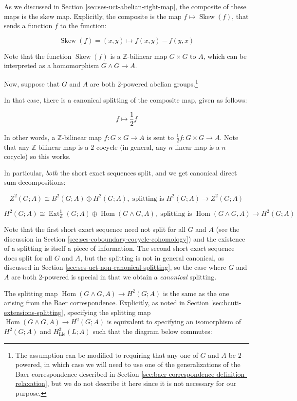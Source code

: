 \documentclass{ucetd}
\begin{document}
As we discussed in Section \ref{sec:ses-uct-abelian-right-map}, the
composite of these maps is the skew map. Explicitly, the composite is
the map $f \mapsto \operatorname{Skew}(f)$, that sends a function $f$
to the function:

$$\operatorname{Skew}(f) = (x,y) \mapsto f(x,y) - f(y,x)$$

Note that the function $\operatorname{Skew}(f)$ is a
$\mathbb{Z}$-bilinear map $G \times G$ to $A$, which can be
interpreted as a homomorphism $G \wedge G \to A$.

Now, suppose that $G$ and $A$ are both $2$-powered abelian
groups.\footnote{The assumption can be modified to requiring that any
  one of $G$ and $A$ be $2$-powered, in which case we will need to use
  one of the generalizations of the Baer correspondence described in
  Section \ref{sec:baer-correspondence-definition-relaxation}, but we
  do not describe it here since it is not necessary for our purpose.}

In that case, there is a canonical splitting of the composite map,
given as follows:

$$f \mapsto \frac{1}{2}f$$

In other words, a $\mathbb{Z}$-bilinear map $f: G \times G \to A$ is
sent to $\frac{1}{2}f:G \times G \to A$. Note that any
$\mathbb{Z}$-bilinear map is a $2$-cocycle (in general, any $n$-linear
map is a $n$-cocycle) so this works.

In particular, {\em both} the short exact sequences split, and we get
canonical direct sum decompositions:

$$Z^2(G;A) \cong B^2(G;A) \oplus H^2(G;A), \text{ splitting is } H^2(G;A) \to Z^2(G;A)$$

$$H^2(G;A) \cong \operatorname{Ext}^1_{\mathbb{Z}}(G;A) \oplus \operatorname{Hom}(G \wedge G,A), \text{ splitting is } \operatorname{Hom}(G \wedge G,A) \to H^2(G;A)$$

Note that the first short exact sequence need not split for all $G$
and $A$ (see the discussion in Section
\ref{sec:ses-coboundary-cocycle-cohomology}) and the existence of a
splitting is itself a piece of information. The second short exact
sequence does split for all $G$ and $A$, but the splitting is not in
general canonical, as discussed in Section
\ref{sec:ses-uct-non-canonical-splitting}, so the case where $G$ and
$A$ are both $2$-powered is special in that we obtain a {\em
  canonical} splitting.

The splitting map $\operatorname{Hom}(G\wedge G,A) \to H^2(G;A)$ is
the same as the one arising from the Baer correspondence. Explicitly,
as noted in Section \ref{sec:bcuti-extensions-splitting}, specifying the
splitting map $\operatorname{Hom}(G \wedge G, A) \to H^2(G;A)$ is
equivalent to specifying an isomorphism of $H^2(G;A)$ and
$H^2_{\text{Lie}}(L;A)$ such that the diagram below commutes:
\end{document}

